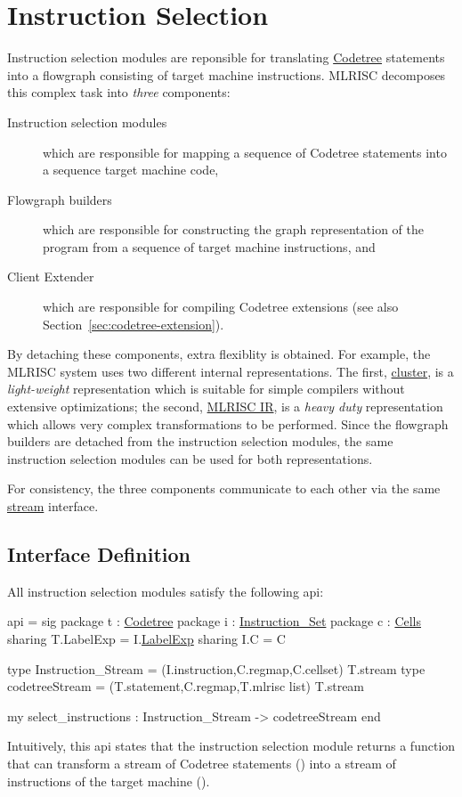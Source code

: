 \section{Instruction Selection} \label{sec:instrsel}
Instruction selection modules are reponsible for translating 
\href{codetree.html}{Codetree} statements into a flowgraph consisting
of target machine instructions.  MLRISC decomposes this complex task 
into \emph{three} components:
\begin{description}
   \item[Instruction selection modules] which are responsible for
mapping a sequence of Codetree statements into a sequence target machine code,
   \item[Flowgraph builders]  which are responsible for constructing
the graph representation of the program from a sequence of target machine
instructions, and
   \item[Client Extender] which are responsible for compiling 
Codetree extensions (see also Section~\ref{sec:codetree-extension}).
\end{description}
By detaching these components, extra flexiblity is obtained.  For example,
the MLRISC system uses two different internal representations.  The
first, \href{cluster.html}{cluster}, is a \emph{light-weight} representation
which is suitable for simple compilers without extensive 
optimizations; the second, \href{mlrisc-ir.html}{MLRISC IR}, is a 
\emph{heavy duty} representation which allows very complex transformations
to be performed.  Since the flowgraph builders are detached from the
instruction selection modules, the same instruction selection modules
can be used for both representations.  

For consistency, the three components communicate to each other 
via the same \href{stream.html}{stream} interface.

\subsection{Interface Definition}
All instruction selection modules satisfy the following api:

\begin{SML}
api  = 
sig
   package t : \href{codetree.html}{Codetree}
   package i : \href{instructions.html}{Instruction_Set}
   package c : \href{cells.html}{Cells}
      sharing T.LabelExp = I.\href{labelexp.html}{LabelExp}
      sharing I.C = C

   type Instruction_Stream = (I.instruction,C.regmap,C.cellset) T.stream
   type codetreeStream = (T.statement,C.regmap,T.mlrisc list) T.stream

   my select_instructions : Instruction_Stream -> codetreeStream
end
\end{SML}
Intuitively, this api states that
the instruction selection module 
returns a function that can transform a stream of Codetree statements 
() into a stream of instructions of the target 
machine ().  

